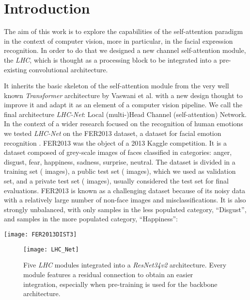 \documentclass[fleqn,10pt]{SelfArx}
\begin{document}
\flushbottom 

\maketitle 

\tableofcontents 

\thispagestyle{empty} 



\section*{Introduction} 


The aim of this work is to explore the capabilities of the self-attention paradigm in the context of computer vision, more in particular, in the facial expression recognition. In order to do that we designed a new channel self-attention module, the \textit{LHC}, which is thought as a processing block to be integrated into a pre-existing convolutional architecture. 

It inherits the basic skeleton of the self-attention module from the very well known \textit{Transformer} architecture by Vaswani et al. \cite{Transformer} with a new design thought to improve it and adapt it as an element of a computer vision pipeline. We call the final architecture \textit{LHC-Net}: Local (multi-)Head Channel (self-attention) Network.
In the context of a wider research focused on the recognition of human emotions we tested \textit{LHC-Net} on the FER2013 dataset, a dataset for facial emotion recognition \cite{FER2013}. FER2013 was the object of a 2013 Kaggle competition. It is a dataset composed of  grey-scale  images of faces classified in  categories: anger, disgust, fear, happiness, sadness, surprise, neutral. The dataset is divided in a training set ( images), a public test set ( images), which we used as validation set, and a private test set ( images), usually considered the test set for final evaluations. FER2013 is known as a challenging dataset because of its noisy data with a relatively large number of non-face images and misclassifications. It is also strongly unbalanced, with only  samples in the less populated category, ``Disgust'', and  samples in the more populated category, ``Happiness'':

\noindent\texttt{[image: FER2013DIST3]}

\begin{figure*}[ht]\centering \texttt{[image: LHC\_Net]}
\caption{Five \textit{LHC} modules integrated into a \textit{ResNet34v2} architecture. Every module features a residual connection to obtain an easier integration, especially when pre-training is used for the backbone architecture.}
\end{figure*}
\end{document}
